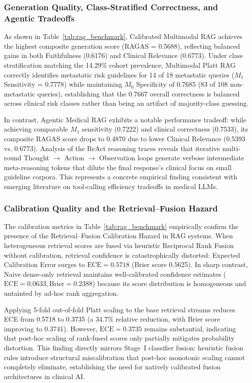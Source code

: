 \subsubsection{Generation Quality, Class-Stratified Correctness, and Agentic Tradeoffs}

As shown in Table~\ref{tab:rag_benchmark}, Calibrated Multimodal RAG achieves the highest composite generation score (RAGAS = 0.5688), reflecting balanced gains in both Faithfulness (0.6176) and Clinical Relevance (0.6773). Under class stratification matching the 14.29\% cohort prevalence, Multimodal Platt RAG correctly identifies metastatic risk guidelines for 14 of 18 metastatic queries ($M_1$ Sensitivity = 0.7778) while maintaining $M_0$ Specificity of 0.7685 (83 of 108 non-metastatic queries), establishing that the 0.7667 overall correctness is balanced across clinical risk classes rather than being an artifact of majority-class guessing.

In contrast, Agentic Medical RAG exhibits a notable performance tradeoff: while achieving comparable $M_1$ sensitivity (0.7222) and clinical correctness (0.7533), its composite RAGAS score drops to 0.4870 due to lower Clinical Relevance (0.5393 vs. 0.6773). Analysis of the ReAct reasoning traces reveals that iterative multi-round Thought $\to$ Action $\to$ Observation loops generate verbose intermediate meta-reasoning tokens that dilute the final response's clinical focus on small guideline corpora. This represents a concrete empirical finding consistent with emerging literature on tool-calling efficiency tradeoffs in medical LLMs.

\subsubsection{Calibration Quality and the Retrieval--Fusion Hazard}

The calibration metrics in Table~\ref{tab:rag_benchmark} empirically confirm the presence of the Retrieval--Fusion Calibration Hazard in RAG systems. When heterogeneous retrieval scores are fused via heuristic Reciprocal Rank Fusion without calibration, retrieval confidence is catastrophically distorted: Expected Calibration Error surges to $\text{ECE} = 0.5718$ (Brier score 0.5625). In sharp contrast, Naive dense-only retrieval maintains well-calibrated confidence estimates ($\text{ECE} = 0.0633, \text{Brier} = 0.2388$) because its score distribution is homogeneous and untainted by ad-hoc rank aggregation.

Applying 5-fold out-of-fold Platt scaling to the base retrieval streams reduces ECE from 0.5718 to 0.3735 (a 34.7\% relative reduction, with Brier score improving to 0.3741). However, $\text{ECE} = 0.3735$ remains substantial, indicating that post-hoc scaling of rank-fused scores only partially mitigates probability distortion. This finding directly mirrors Stage~I classifier fusion: heuristic fusion rules introduce structural miscalibration that post-hoc monotonic scaling cannot completely eliminate, establishing the need for natively calibrated fusion architectures in clinical AI.

